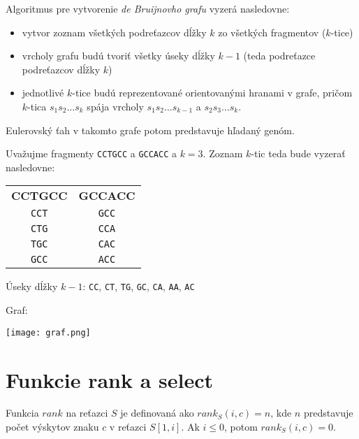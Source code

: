     Algoritmus pre vytvorenie \emph{de Bruijnovho grafu} vyzerá nasledovne:
    
    \begin{itemize}
        \item vytvor zoznam všetkých podreťazcov dĺžky $k$ zo všetkých
        fragmentov ($k$-tice)
        \item vrcholy grafu budú tvoriť všetky úseky dĺžky $k - 1$ (teda
        podreťazce podreťazcov dĺžky $k$)
        \item jednotlivé $k$-tice budú reprezentované orientovanými hranami v
        grafe, pričom $k$-tica $s_1 s_2 \ldots s_k$ spája vrcholy $s_1 s_2
        \ldots s_{k-1}$ a $s_2 s_3 \ldots s_k$. 
    \end{itemize}
    
    Eulerovský ťah v takomto grafe potom predstavuje hľadaný genóm.
    
    \begin{example}
        Uvažujme fragmenty \texttt{CCTGCC} a \texttt{GCCACC} a $k = 3$. Zoznam
        $k$-tic teda bude vyzerať nasledovne:
        
        \bigskip
        
        \begin{tabular}{ c c }
            \textbf{CCTGCC} & \textbf{GCCACC} \\  
            \texttt{CCT}    & \texttt{GCC}    \\
            \texttt{CTG}    & \texttt{CCA}    \\
            \texttt{TGC}    & \texttt{CAC}    \\
            \texttt{GCC}    & \texttt{ACC}    \\
        \end{tabular}  
        
        \bigskip
        
        Úseky dĺžky $k-1$: \texttt{CC}, \texttt{CT}, \texttt{TG}, \texttt{GC},
        \texttt{CA}, \texttt{AA}, \texttt{AC}
        
        \bigskip
        
        Graf: 
        
        \texttt{[image: graf.png]}
    \end{example}

\section{Funkcie rank a select}
\begin{defn}
    Funkcia $rank$ na reťazci $S$ je definovaná ako $rank_S(i, c) = n$, kde $n$
    predstavuje počet výskytov znaku $c$ v reťazci $S[1, i]$. Ak $i \leq 0$,
    potom $rank_S(i, c) = 0$.
\end{defn}

